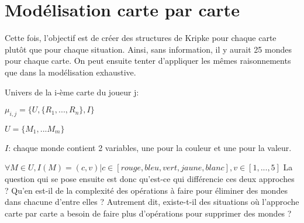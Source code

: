 \documentclass{article}
\begin{document}
\section{Modélisation carte par carte}

Cette fois, l'objectif est de créer des structures de Kripke pour chaque carte plutôt que pour chaque situation. Ainsi, sans information, il y aurait 25 mondes pour chaque carte. On peut ensuite tenter d'appliquer les mêmes raisonnements que dans la modélisation exhaustive.

Univers de la i-ème carte du joueur j:

$   \mu_{i,j}=\{U,\{R_{1},...,R_{n}\},I \}  $

$   U=\{M_{1},...M_{m} \}   $

$I$: chaque monde contient 2 variables, une pour la couleur et une pour la valeur. 

$\forall M \in U, I(M)=(c,v)|c\in[rouge,bleu,vert,jaune,blanc],v\in[1,...,5]$
\smallbreak
La question qui se pose ensuite est donc qu'est-ce qui différencie ces deux approches ?
Qu'en est-il de la complexité des opérations à faire pour éliminer des mondes dans chacune d'entre elles ? Autrement dit, existe-t-il des situations où l'approche carte par carte a besoin de faire plus
d'opérations pour supprimer des mondes ?
\end{document}
